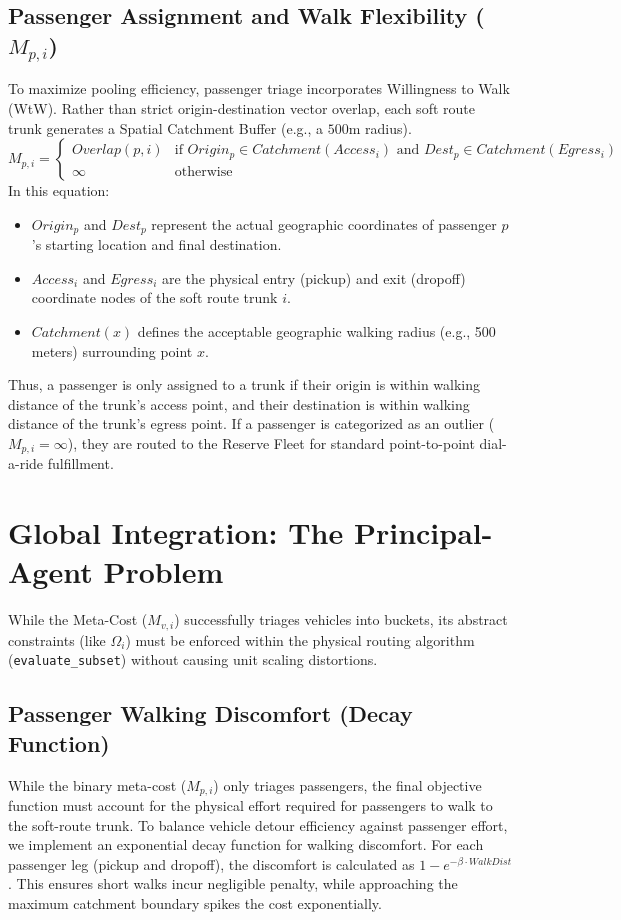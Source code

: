 \documentclass[12pt,a4paper]{article}
\begin{document}
\subsection[Passenger Assignment Meta-Cost (M p,i)]{Passenger Assignment and Walk Flexibility ($M_{p, i}$)}
To maximize pooling efficiency, passenger triage incorporates Willingness to Walk (WtW). Rather than strict origin-destination vector overlap, each soft route trunk generates a Spatial Catchment Buffer (e.g., a $500$m radius). 
\begin{equation}
    M_{p, i} = 
    \begin{cases} 
      Overlap(p, i) & \text{if } Origin_p \in Catchment(Access_i) \text{ and } Dest_p \in Catchment(Egress_i) \\
      \infty & \text{otherwise}
   \end{cases}
\end{equation}
In this equation:
\begin{itemize}
    \item $Origin_p$ and $Dest_p$ represent the actual geographic coordinates of passenger $p$'s starting location and final destination.
    \item $Access_i$ and $Egress_i$ are the physical entry (pickup) and exit (dropoff) coordinate nodes of the soft route trunk $i$.
    \item $Catchment(x)$ defines the acceptable geographic walking radius (e.g., 500 meters) surrounding point $x$.
\end{itemize}
Thus, a passenger is only assigned to a trunk if their origin is within walking distance of the trunk's access point, and their destination is within walking distance of the trunk's egress point. If a passenger is categorized as an outlier ($M_{p, i} = \infty$), they are routed to the Reserve Fleet for standard point-to-point dial-a-ride fulfillment.

\section{Global Integration: The Principal-Agent Problem}
While the Meta-Cost ($M_{v, i}$) successfully triages vehicles into buckets, its abstract constraints (like $\Omega_i$) must be enforced within the physical routing algorithm (\texttt{evaluate\_subset}) without causing unit scaling distortions.

\subsection{Passenger Walking Discomfort (Decay Function)}
While the binary meta-cost ($M_{p, i}$) only triages passengers, the final objective function must account for the physical effort required for passengers to walk to the soft-route trunk. To balance vehicle detour efficiency against passenger effort, we implement an exponential decay function for walking discomfort. For each passenger leg (pickup and dropoff), the discomfort is calculated as $1 - e^{-\beta \cdot WalkDist}$. This ensures short walks incur negligible penalty, while approaching the maximum catchment boundary spikes the cost exponentially.
\end{document}
